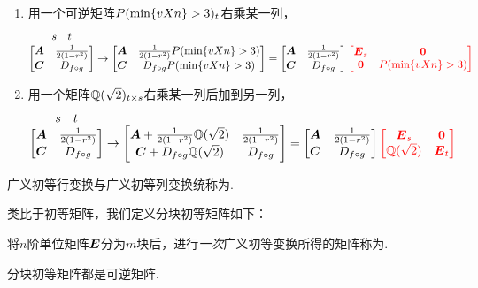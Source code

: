 \begin{definition}
\begin{enumerate}
\item 用一个可逆矩阵\(\P_t\)右乘某一列，\[
\originalmatrixHead \to \begin{bmatrix}
\A & \B \P \\
\C & \D \P
\end{bmatrix} = \originalmatrix {\color{red} \begin{bmatrix}
\E_s & \z \\
\z & \P
\end{bmatrix}}
\]

\item 用一个矩阵\(\Q_{t \times s}\)右乘某一列后加到另一列，\[
\originalmatrixHead \to \begin{bmatrix}
\A + \B \Q & \B \\
\C + \D \Q & \D
\end{bmatrix} = \originalmatrix {\color{red} \begin{bmatrix}
\E_s & \z \\
\Q & \E_t
\end{bmatrix}}
\]
\end{enumerate}

广义初等行变换与广义初等列变换统称为.
\end{definition}

类比于初等矩阵，我们定义分块初等矩阵如下：
\begin{definition}
将\(n\)阶单位矩阵\(\E\)分为\(m\)块后，进行\emph{一次}广义初等变换所得的矩阵称为.
\end{definition}

\begin{property}
分块初等矩阵都是可逆矩阵.
\end{property}

